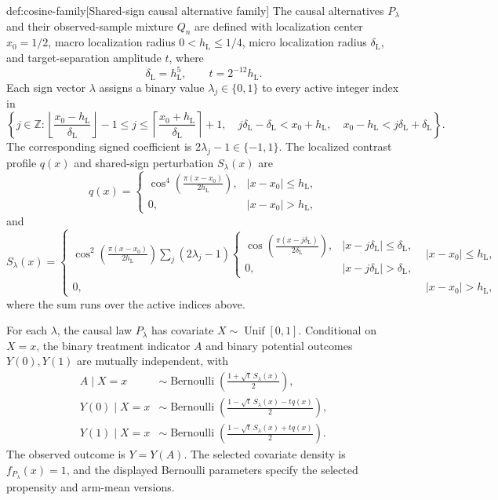 \documentclass[11pt]{article}
\begin{document}
\begin{definitionv}{def:cosine-family}[Shared-sign causal alternative family]
The causal alternatives \(P_\lambda\) and their observed-sample mixture \(Q_n\) are defined with localization center \(x_0=1/2\), macro localization radius \(0<h_{\mathrm L}\le 1/4\), micro localization radius \(\delta_{\mathrm L}\), and target-separation amplitude \(t\), where
\[
\delta_{\mathrm L}=h_{\mathrm L}^{5},
\qquad
t=2^{-12}h_{\mathrm L}.
\]
Each sign vector \(\lambda\) assigns a binary value \(\lambda_j\in\{0,1\}\) to every active integer index in
\[
\left\{
j\in\mathbb Z:
\left\lfloor\frac{x_0-h_{\mathrm L}}{\delta_{\mathrm L}}\right\rfloor-1
\le j\le
\left\lceil\frac{x_0+h_{\mathrm L}}{\delta_{\mathrm L}}\right\rceil+1,\quad
j\delta_{\mathrm L}-\delta_{\mathrm L}<x_0+h_{\mathrm L},\quad
x_0-h_{\mathrm L}<j\delta_{\mathrm L}+\delta_{\mathrm L}
\right\}.
\]
The corresponding signed coefficient is \(2\lambda_j-1\in\{-1,1\}\). The localized contrast profile \(q(x)\) and shared-sign perturbation \(S_\lambda(x)\) are
\[
q(x)=
\begin{cases}
\displaystyle
\cos^{4}\!\left(\frac{\pi(x-x_0)}{2h_{\mathrm L}}\right),
& |x-x_0|\le h_{\mathrm L},\\
0,& |x-x_0|>h_{\mathrm L},
\end{cases}
\]
and
\[
S_\lambda(x)=
\begin{cases}
\displaystyle
\cos^{2}\!\left(\frac{\pi(x-x_0)}{2h_{\mathrm L}}\right)
\sum_j(2\lambda_j-1)
\begin{cases}
\displaystyle
\cos\!\left(\frac{\pi(x-j\delta_{\mathrm L})}{2\delta_{\mathrm L}}\right),
& |x-j\delta_{\mathrm L}|\le\delta_{\mathrm L},\\
0,& |x-j\delta_{\mathrm L}|>\delta_{\mathrm L},
\end{cases}
& |x-x_0|\le h_{\mathrm L},\\
0,& |x-x_0|>h_{\mathrm L},
\end{cases}
\]
where the sum runs over the active indices above.

For each \(\lambda\), the causal law \(P_\lambda\) has covariate \(X\sim\operatorname{Unif}[0,1]\). Conditional on \(X=x\), the binary treatment indicator \(A\) and binary potential outcomes \(Y(0),Y(1)\) are mutually independent, with
\[
\begin{aligned}
A\mid X=x
&\sim\operatorname{Bernoulli}
\left(\frac{1+\sqrt t\,S_\lambda(x)}{2}\right),\\
Y(0)\mid X=x
&\sim\operatorname{Bernoulli}
\left(\frac{1-\sqrt t\,S_\lambda(x)-tq(x)}{2}\right),\\
Y(1)\mid X=x
&\sim\operatorname{Bernoulli}
\left(\frac{1-\sqrt t\,S_\lambda(x)+tq(x)}{2}\right).
\end{aligned}
\]
The observed outcome is \(Y=Y(A)\). The selected covariate density is \(f_{P_\lambda}(x)=1\), and the displayed Bernoulli parameters specify the selected propensity and arm-mean versions.


\end{definitionv}
\end{document}
